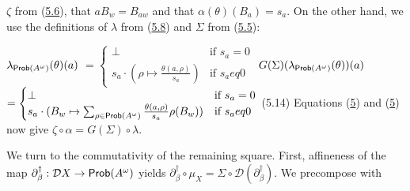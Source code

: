 \documentclass[11pt,a4paper]{amsart}
\begin{document}
\hypertarget{html:S5.SS0.SSS0.Px2.SPx1.p4.m6}{}\({\zeta}\) from (\hyperlink{html:S5.E6}{5.6}), that %
\hypertarget{html:S5.SS0.SSS0.Px2.SPx1.p4.m7}{}\({aB_{w}=B_{aw}}\) and that %
\hypertarget{html:S5.SS0.SSS0.Px2.SPx1.p4.m8}{}\({\alpha(\theta)(B_{a})=s_{a}}\). On the other hand, we use the definitions of %
\hypertarget{html:S5.SS0.SSS0.Px2.SPx1.p4.m9}{}\({\lambda}\) from (\hyperlink{html:S5.E8}{5.8}) and %
\hypertarget{html:S5.SS0.SSS0.Px2.SPx1.p4.m10}{}\({\Sigma}\) from (\hyperlink{html:S5.E5}{5.5}):
\par\medskip
\hypertarget{html:S8.EGx9}{} %
\hypertarget{html:S5.Ex8}{}  %
\hypertarget{html:S5.Ex8.m1}{}\({\displaystyle\lambda_{\text{\sf Prob}(A^{\omega})}(\theta)(a)}\) %
\hypertarget{html:S5.Ex8.m2}{}\({\displaystyle=\begin{cases}\bot&\mbox{if $s_{a}=0$}\\
s_{a}\cdot(\rho\mapsto\frac{\theta(a,\rho)}{s_{a}})&\mbox{if $s_{a}
eq 0$}\end{cases}}\)   %
\hypertarget{html:S5.E14}{}  %
\hypertarget{html:S5.E14.m1}{}\({\displaystyle G(\Sigma)(\lambda_{\text{\sf Prob}(A^{\omega})}(\theta))(a)}\) %
\hypertarget{html:S5.E14.m2}{}\({\displaystyle=\begin{cases}\bot&\mbox{if $s_{a}=0$}\\
s_{a}\cdot(B_{w}\mapsto\sum_{\rho\in\text{\sf Prob}(A^{\omega})}\frac{\theta(a,\rho)}{s_{a}}\rho(B_{w}))&\mbox{if $s_{a}
eq 0$}\end{cases}}\)  (5.14)   Equations (\hyperlink{html:S5.Ex7}{5}) and (\hyperlink{html:S5.Ex8}{5}) now give %
\hypertarget{html:S5.SS0.SSS0.Px2.SPx1.p4.m11}{}\({\zeta\circ\alpha=G(\Sigma)\circ\lambda}\).
\par\medskip
\hypertarget{html:S5.SS0.SSS0.Px2.SPx1.p5}{} We turn to the commutativity of the remaining square. First, affineness of the map %
\hypertarget{html:S5.SS0.SSS0.Px2.SPx1.p5.m1}{}\({\partial_{\beta}^{\dagger}:{\mathcal{D}}X\to\text{\sf Prob}(A^{\omega})}\) yields %
\hypertarget{html:S5.SS0.SSS0.Px2.SPx1.p5.m2}{}\({\partial_{\beta}^{\dagger}\circ\mu_{X}=\Sigma\circ{\mathcal{D}}(\partial_{\beta}^{\dagger})}\). We precompose with %
\end{document}
